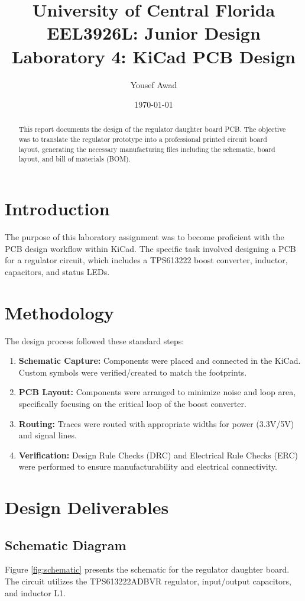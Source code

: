 \documentclass[12pt, letterpaper]{article}
\title{
    \textbf{University of Central Florida} \\
    \textbf{EEL3926L: Junior Design} \\ \vspace{10pt}
    \textbf{Laboratory 4: KiCad PCB Design}
}
\author{Yousef Awad}
\date{\today}
\begin{document}
\maketitle

\begin{abstract}
	This report documents the design of the regulator daughter board PCB. The objective was to translate the regulator prototype into a professional printed circuit board layout, generating the necessary manufacturing files including the schematic, board layout, and bill of materials (BOM).
\end{abstract}

\tableofcontents
\newpage

\section{Introduction}
The purpose of this laboratory assignment was to become proficient with the PCB design workflow within KiCad. The specific task involved designing a PCB for a regulator circuit, which includes a TPS613222 boost converter, inductor, capacitors, and status LEDs.

\section{Methodology}
The design process followed these standard steps:
\begin{enumerate}
	\item \textbf{Schematic Capture:} Components were placed and connected in the KiCad. Custom symbols were verified/created to match the footprints.
	\item \textbf{PCB Layout:} Components were arranged to minimize noise and loop area, specifically focusing on the critical loop of the boost converter.
	\item \textbf{Routing:} Traces were routed with appropriate widths for power (3.3V/5V) and signal lines.
	\item \textbf{Verification:} Design Rule Checks (DRC) and Electrical Rule Checks (ERC) were performed to ensure manufacturability and electrical connectivity.
\end{enumerate}

\section{Design Deliverables}

\subsection{Schematic Diagram}
Figure \ref{fig:schematic} presents the schematic for the regulator daughter board. The circuit utilizes the TPS613222ADBVR regulator, input/output capacitors, and inductor L1.
\end{document}
